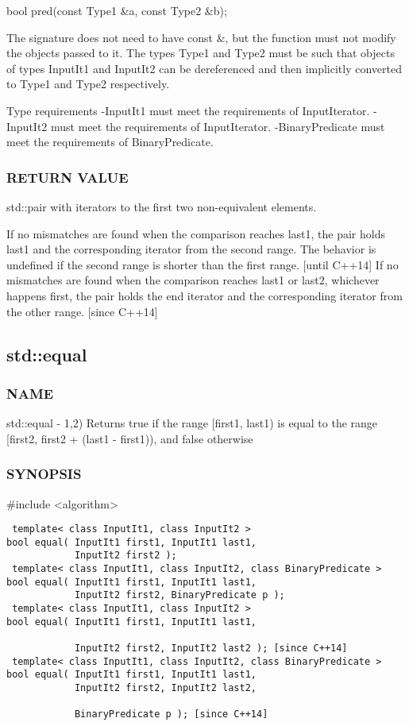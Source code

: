  bool pred(const Type1 \&a, const Type2 \&b);

The signature does not need to have const \&, but the function must not modify the objects passed to it.
The types Type1 and Type2 must be such that objects of types InputIt1 and InputIt2 can be dereferenced and then implicitly converted to Type1 and Type2 respectively.


 Type requirements
 -InputIt1 must meet the requirements of InputIterator.
 -InputIt2 must meet the requirements of InputIterator.
 -BinaryPredicate must meet the requirements of BinaryPredicate.

\subsubsection{RETURN VALUE}
std::pair with iterators to the first two non-equivalent elements.

 If no mismatches are found when the comparison reaches last1, the pair holds last1 and the corresponding iterator from the second range. The behavior is undefined if the second range is shorter than the first range. [until C++14]
 If no mismatches are found when the comparison reaches last1 or last2, whichever happens first, the pair holds the end iterator and the corresponding iterator from the other range. [since C++14]


\subsection{std::equal}

\subsubsection{NAME}
std::equal - 1,2) Returns true if the range [first1, last1) is equal to the range [first2, first2 + (last1 - first1)), and false otherwise

\subsubsection{SYNOPSIS}
\#include <algorithm>

\begin{lstlisting}
 template< class InputIt1, class InputIt2 >
bool equal( InputIt1 first1, InputIt1 last1,
            InputIt2 first2 );
 template< class InputIt1, class InputIt2, class BinaryPredicate >
bool equal( InputIt1 first1, InputIt1 last1,
            InputIt2 first2, BinaryPredicate p );
 template< class InputIt1, class InputIt2 >
bool equal( InputIt1 first1, InputIt1 last1,

            InputIt2 first2, InputIt2 last2 ); [since C++14]
 template< class InputIt1, class InputIt2, class BinaryPredicate >
bool equal( InputIt1 first1, InputIt1 last1,
            InputIt2 first2, InputIt2 last2,

            BinaryPredicate p ); [since C++14]
\end{lstlisting}


